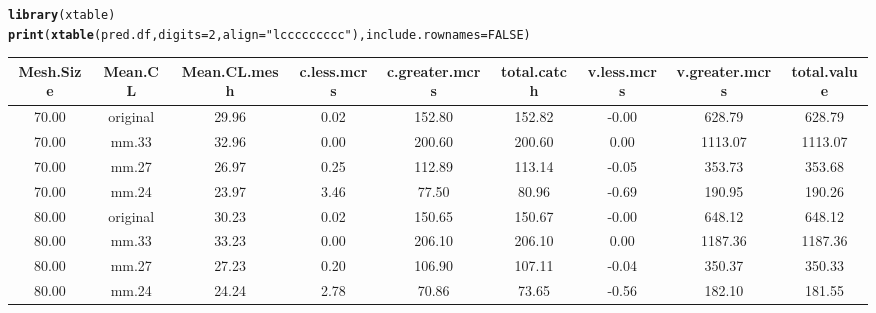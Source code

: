 \documentclass[12pt]{article}\usepackage[]{graphicx}\usepackage[]{color}
\makeatletter
\newcommand{\hlnum}[1]{\textcolor[rgb]{0.686,0.059,0.569}{#1}}%
\newcommand{\hlstr}[1]{\textcolor[rgb]{0.192,0.494,0.8}{#1}}%
\newcommand{\hlstd}[1]{\textcolor[rgb]{0.345,0.345,0.345}{#1}}%
\newcommand{\hlkwc}[1]{\textcolor[rgb]{0.333,0.667,0.333}{#1}}%
\newcommand{\hlkwd}[1]{\textcolor[rgb]{0.737,0.353,0.396}{\textbf{#1}}}%
\newenvironment{kframe}{%
 \def\at@end@of@kframe{}%
 \ifinner\ifhmode%
  \def\at@end@of@kframe{\end{minipage}}%
  \begin{minipage}{\columnwidth}%
 \fi\fi%
 \def\FrameCommand##1{\hskip\@totalleftmargin \hskip-\fboxsep
 \colorbox{shadecolor}{##1}\hskip-\fboxsep
     \hskip-\linewidth \hskip-\@totalleftmargin \hskip\columnwidth}%
 \MakeFramed {\advance\hsize-\width
   \@totalleftmargin\z@ \linewidth\hsize
   \@setminipage}}%
 {\par\unskip\endMakeFramed%
 \at@end@of@kframe}
\makeatother
\begin{document}
\begin{landscape}
\begin{kframe}
\begin{alltt}
\hlkwd{library}\hlstd{(xtable)}
\hlkwd{print}\hlstd{(}\hlkwd{xtable}\hlstd{(pred.df,} \hlkwc{digits} \hlstd{=} \hlnum{2}\hlstd{,} \hlkwc{align} \hlstd{=} \hlstr{"lccccccccc"}\hlstd{),} \hlkwc{include.rownames} \hlstd{=} \hlnum{FALSE}\hlstd{)}
\end{alltt}
\end{kframe}%
\begin{table}[ht]
\centering
\begin{tabular}{ccccccccc}
  \hline
Mesh.Size & Mean.CL & Mean.CL.mesh & c.less.mcrs & c.greater.mcrs & total.catch & v.less.mcrs & v.greater.mcrs & total.value \\ 
  \hline
70.00 & original & 29.96 & 0.02 & 152.80 & 152.82 & -0.00 & 628.79 & 628.79 \\ 
  70.00 & mm.33 & 32.96 & 0.00 & 200.60 & 200.60 & 0.00 & 1113.07 & 1113.07 \\ 
  70.00 & mm.27 & 26.97 & 0.25 & 112.89 & 113.14 & -0.05 & 353.73 & 353.68 \\ 
  70.00 & mm.24 & 23.97 & 3.46 & 77.50 & 80.96 & -0.69 & 190.95 & 190.26 \\ 
  80.00 & original & 30.23 & 0.02 & 150.65 & 150.67 & -0.00 & 648.12 & 648.12 \\ 
  80.00 & mm.33 & 33.23 & 0.00 & 206.10 & 206.10 & 0.00 & 1187.36 & 1187.36 \\ 
  80.00 & mm.27 & 27.23 & 0.20 & 106.90 & 107.11 & -0.04 & 350.37 & 350.33 \\ 
  80.00 & mm.24 & 24.24 & 2.78 & 70.86 & 73.65 & -0.56 & 182.10 & 181.55 \\ 
   \hline
\end{tabular}
\end{table}

\end{landscape}



\end{document}
